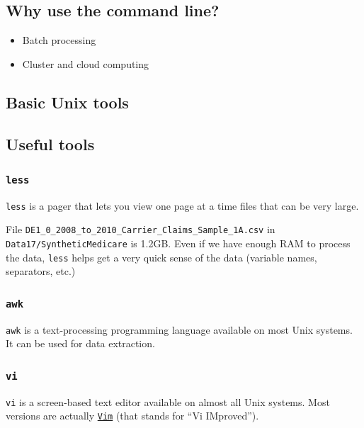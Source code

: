 \documentclass[]{book}
\theoremstyle{definition}
\theoremstyle{definition}
\theoremstyle{definition}
\theoremstyle{remark}
\begin{document}
\subsection{Why use the command line?}\label{why-use-the-command-line}

\begin{itemize}
\item
  Batch processing
\item
  Cluster and cloud computing
\end{itemize}

\subsection{Basic Unix tools}\label{basic-unix-tools}

\subsection{Useful tools}\label{useful-tools}

\subsubsection{\texorpdfstring{\texttt{less}}{less}}\label{less}

\texttt{less} is a pager that lets you view one page at a time files
that can be very large.

File \texttt{DE1\_0\_2008\_to\_2010\_Carrier\_Claims\_Sample\_1A.csv} in
\texttt{Data17/SyntheticMedicare} is 1.2GB. Even if we have enough RAM
to process the data, \texttt{less} helps get a very quick sense of the
data (variable names, separators, etc.)

\subsubsection{\texorpdfstring{\texttt{awk}}{awk}}\label{awk}

\texttt{awk} is a text-processing programming language available on most
Unix systems. It can be used for data extraction.

\subsubsection{\texorpdfstring{\texttt{vi}}{vi}}\label{vi}

\texttt{vi} is a screen-based text editor available on almost all Unix
systems. Most versions are actually
\href{http://www.vim.org/}{\texttt{Vim}} (that stands for ``Vi
IMproved'').
\end{document}
